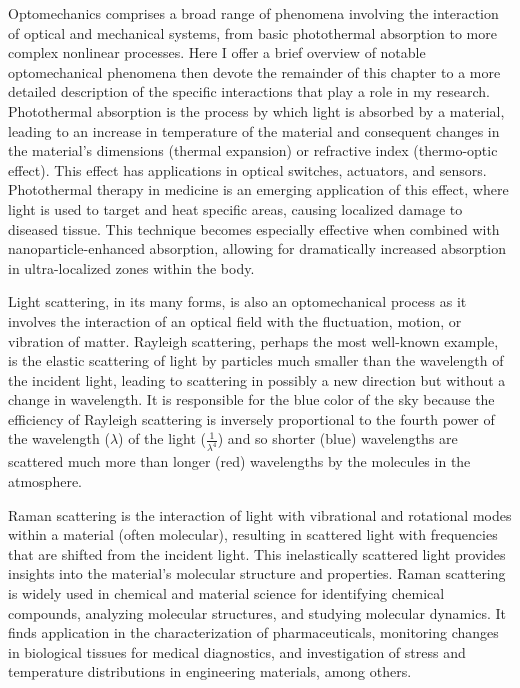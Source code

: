 Optomechanics comprises a broad range of phenomena involving the interaction of optical and mechanical systems, from basic photothermal absorption to more complex nonlinear processes. Here I offer a brief overview of notable optomechanical phenomena then devote the remainder of this chapter to a more detailed description of the specific interactions that play a role in my research. Photothermal absorption is the process by which light is absorbed by a material, leading to an increase in temperature of the material and consequent changes in the material's dimensions (thermal expansion) or refractive index (thermo-optic effect). This effect has applications in optical switches\cite{}, actuators\cite{}, and sensors\cite{}. Photothermal therapy in medicine is an emerging application of this effect, where light is used to target and heat specific areas, causing localized damage to diseased tissue\cite{}. This technique becomes especially effective when combined with nanoparticle-enhanced absorption, allowing for dramatically increased absorption in ultra-localized zones within the body.

Light scattering, in its many forms, is also an optomechanical process as it involves the interaction of an optical field with the fluctuation, motion, or vibration of matter. Rayleigh scattering, perhaps the most well-known example, is the elastic scattering of light by particles much smaller than the wavelength of the incident light, leading to scattering in possibly a new direction but without a change in wavelength. It is responsible for the blue color of the sky because the efficiency of Rayleigh scattering is inversely proportional to the fourth power of the wavelength ($\lambda$) of the light ($\frac{1}{\lambda^{4}}$) and so shorter (blue) wavelengths are scattered much more than longer (red) wavelengths by the molecules in the atmosphere.\cite{rayleigh1871light}

Raman scattering is the interaction of light with vibrational and rotational modes within a material (often molecular), resulting in scattered light with frequencies that are shifted from the incident light. This inelastically scattered light provides insights into the material's molecular structure and properties. Raman scattering is widely used in chemical and material science for identifying chemical compounds, analyzing molecular structures, and studying molecular dynamics. It finds application in the characterization of pharmaceuticals\cite{}, monitoring changes in biological tissues for medical diagnostics\cite{}, and investigation of stress and temperature distributions in engineering materials\cite{}, among others\cite{}.

